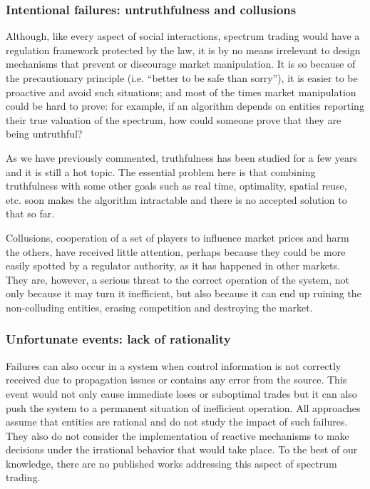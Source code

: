 \subsubsection{Intentional failures: untruthfulness and collusions}
Although, like every aspect of social interactions, spectrum trading would have a regulation framework protected by the law, it is by no means irrelevant to design mechanisms that prevent or discourage market manipulation. It is so because of the precautionary principle (i.e. ``better to be safe than sorry''), it is easier to be proactive and avoid such situations; and most of the times market manipulation could be hard to prove: for example, if an algorithm depends on entities reporting their true valuation of the spectrum, how could someone prove that they are being untruthful?

As we have previously commented, truthfulness has been studied for a few years and it is still a hot topic. The essential problem here is that combining truthfulness with some other goals such as real time, optimality, spatial reuse, etc. soon makes the algorithm intractable and there is no accepted solution to that so far.

Collusions, cooperation of a set of players to influence market prices and harm the others, have received little attention, perhaps because they could be more easily spotted by a regulator authority, as it has happened in other markets. 
They are, however, a serious threat to the correct operation of the system, not only because it may turn it inefficient, but also because it can end up ruining the non-colluding entities, erasing competition and destroying the market.

\subsubsection{Unfortunate events: lack of rationality}
Failures can also occur in a system when control information is not correctly received due to propagation issues or contains any error from the source. 
This event would not only cause immediate loses or suboptimal trades but it can also push the system to a permanent situation of inefficient operation. 
All approaches assume that entities are rational and do not study the impact of such failures. They also do not consider the implementation of reactive mechanisms to make decisions under the irrational behavior that would take place. 
To the best of our knowledge, there are no published works addressing this aspect of spectrum trading.  

